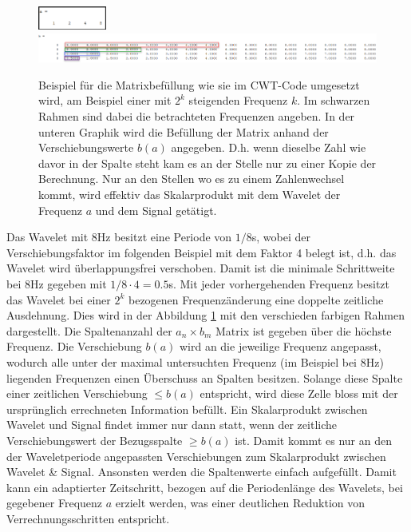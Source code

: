 \begin{figure}
	\centering
	\includegraphics[width=0.2\textwidth]{papers/wavelets/images/17-1_a-Array.png}
	\includegraphics[width=\textwidth]{papers/wavelets/images/17-2_BspFillUp.png}
	\caption{Beispiel für die Matrixbefüllung wie sie im CWT-Code umgesetzt wird, am Beispiel einer mit $2^k$ steigenden Frequenz $k$. Im schwarzen Rahmen sind dabei die betrachteten Frequenzen angeben. In der unteren Graphik wird die Befüllung der Matrix anhand der Verschiebungswerte $b(a)$ angegeben. D.h. wenn dieselbe Zahl wie davor in der Spalte steht kam es an der Stelle nur zu einer Kopie der Berechnung. Nur an den Stellen wo es zu einem Zahlenwechsel kommt, wird effektiv das Skalarprodukt mit dem Wavelet der Frequenz $a$ und dem Signal getätigt.}
	\label{wavelet:fig:BspFillUp}
\end{figure}

Das Wavelet mit 8Hz besitzt eine Periode von $1/8$s, wobei der Verschiebungsfaktor im folgenden Beispiel mit dem Faktor 4 belegt ist, d.h. das Wavelet wird überlappungsfrei verschoben. Damit ist die minimale Schrittweite bei 8Hz gegeben mit $1/8\cdot4=0.5$s. Mit jeder vorhergehenden Frequenz besitzt das Wavelet bei einer $2^k$ bezogenen Frequenzänderung eine doppelte zeitliche Ausdehnung. Dies wird in der Abbildung \ref{wavelet:fig:BspFillUp} mit den verschieden farbigen Rahmen dargestellt. Die Spaltenanzahl der $a_n \times b_m$ Matrix ist gegeben über die höchste Frequenz. Die Verschiebung $b(a)$ wird an die jeweilige Frequenz angepasst, wodurch alle unter der maximal untersuchten Frequenz (im Beispiel bei 8Hz) liegenden Frequenzen einen Überschuss an Spalten besitzen. Solange diese Spalte einer zeitlichen Verschiebung $\leq b(a)$ entspricht, wird diese Zelle bloss mit der ursprünglich errechneten Information befüllt. Ein Skalarprodukt zwischen Wavelet und Signal findet immer nur dann statt, wenn der zeitliche Verschiebungswert der Bezugsspalte $\geq b(a)$ ist. Damit kommt es nur an den der Waveletperiode angepassten Verschiebungen zum Skalarprodukt zwischen Wavelet \& Signal. Ansonsten werden die Spaltenwerte einfach aufgefüllt. Damit kann ein adaptierter Zeitschritt, bezogen auf die Periodenlänge des Wavelets, bei gegebener Frequenz $a$ erzielt werden, was einer deutlichen Reduktion von Verrechnungsschritten entspricht.

